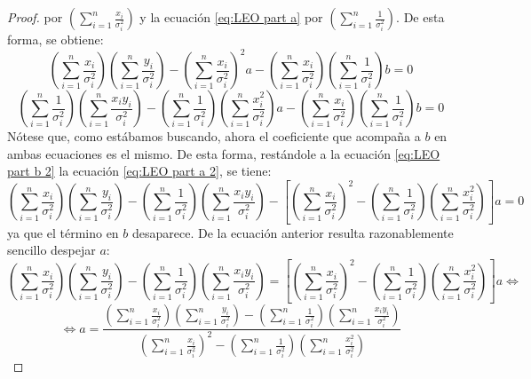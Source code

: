 \documentclass[11pt,a4paper,spanish]{article}
\numberwithin{equation}{section}
\numberwithin{table}{section}
\numberwithin{figure}{section}
\theoremstyle{definition}
\theoremstyle{remark}
\theoremstyle{definition}
\theoremstyle{remark}
\theoremstyle{plain}
\theoremstyle{plain}
\theoremstyle{plain}
\theoremstyle{plain}
\theoremstyle{plain}
\theoremstyle{plain}
\begin{document}
\begin{proof}
		por $\left(\sum_{i=1}^{n}\frac{x_{i}}{\sigma_{i}^{2}}\right)$ y la
		ecuación \vref{eq:LEO part a} por $\left(\sum_{i=1}^{n}\frac{1}{\sigma_{i}^{2}}\right)$.
		De esta forma, se obtiene:
		\begin{equation}
			\left(\sum_{i=1}^{n}\frac{x_{i}}{\sigma_{i}^{2}}\right)\left(\sum_{i=1}^{n}\frac{y_{i}}{\sigma_{i}^{2}}\right)-\left(\sum_{i=1}^{n}\frac{x_{i}}{\sigma_{i}^{2}}\right)^{2}a-\left(\sum_{i=1}^{n}\frac{x_{i}}{\sigma_{i}^{2}}\right)\left(\sum_{i=1}^{n}\frac{1}{\sigma_{i}^{2}}\right)b=0\label{eq:LEO part b 2}
		\end{equation}
		\begin{equation}
			\left(\sum_{i=1}^{n}\frac{1}{\sigma_{i}^{2}}\right)\left(\sum_{i=1}^{n}\frac{x_{i}y_{i}}{\sigma_{i}^{2}}\right)-\left(\sum_{i=1}^{n}\frac{1}{\sigma_{i}^{2}}\right)\left(\sum_{i=1}^{n}\frac{x_{i}^{2}}{\sigma_{i}^{2}}\right)a-\left(\sum_{i=1}^{n}\frac{x_{i}}{\sigma_{i}^{2}}\right)\left(\sum_{i=1}^{n}\frac{1}{\sigma_{i}^{2}}\right)b=0\label{eq:LEO part a 2}
		\end{equation}
		Nótese que, como estábamos buscando, ahora el coeficiente que acompaña
		a $b$ en ambas ecuaciones es el mismo. De esta forma, restándole
		a la ecuación \vref{eq:LEO part b 2} la ecuación \vref{eq:LEO part a 2},
		se tiene:
		\[
		\left(\sum_{i=1}^{n}\frac{x_{i}}{\sigma_{i}^{2}}\right)\left(\sum_{i=1}^{n}\frac{y_{i}}{\sigma_{i}^{2}}\right)-\left(\sum_{i=1}^{n}\frac{1}{\sigma_{i}^{2}}\right)\left(\sum_{i=1}^{n}\frac{x_{i}y_{i}}{\sigma_{i}^{2}}\right)-\left[\left(\sum_{i=1}^{n}\frac{x_{i}}{\sigma_{i}^{2}}\right)^{2}-\left(\sum_{i=1}^{n}\frac{1}{\sigma_{i}^{2}}\right)\left(\sum_{i=1}^{n}\frac{x_{i}^{2}}{\sigma_{i}^{2}}\right)\right]a=0
		\]
		ya que el término en $b$ desaparece. De la ecuación anterior resulta
		razonablemente sencillo despejar $a$:
		\[
		\left(\sum_{i=1}^{n}\frac{x_{i}}{\sigma_{i}^{2}}\right)\left(\sum_{i=1}^{n}\frac{y_{i}}{\sigma_{i}^{2}}\right)-\left(\sum_{i=1}^{n}\frac{1}{\sigma_{i}^{2}}\right)\left(\sum_{i=1}^{n}\frac{x_{i}y_{i}}{\sigma_{i}^{2}}\right)=\left[\left(\sum_{i=1}^{n}\frac{x_{i}}{\sigma_{i}^{2}}\right)^{2}-\left(\sum_{i=1}^{n}\frac{1}{\sigma_{i}^{2}}\right)\left(\sum_{i=1}^{n}\frac{x_{i}^{2}}{\sigma_{i}^{2}}\right)\right]a\iff
		\]
		\[
		\iff a=\frac{\left(\sum_{i=1}^{n}\frac{x_{i}}{\sigma_{i}^{2}}\right)\left(\sum_{i=1}^{n}\frac{y_{i}}{\sigma_{i}^{2}}\right)-\left(\sum_{i=1}^{n}\frac{1}{\sigma_{i}^{2}}\right)\left(\sum_{i=1}^{n}\frac{x_{i}y_{i}}{\sigma_{i}^{2}}\right)}{\left(\sum_{i=1}^{n}\frac{x_{i}}{\sigma_{i}^{2}}\right)^{2}-\left(\sum_{i=1}^{n}\frac{1}{\sigma_{i}^{2}}\right)\left(\sum_{i=1}^{n}\frac{x_{i}^{2}}{\sigma_{i}^{2}}\right)}
\]
\end{proof}
\end{document}
